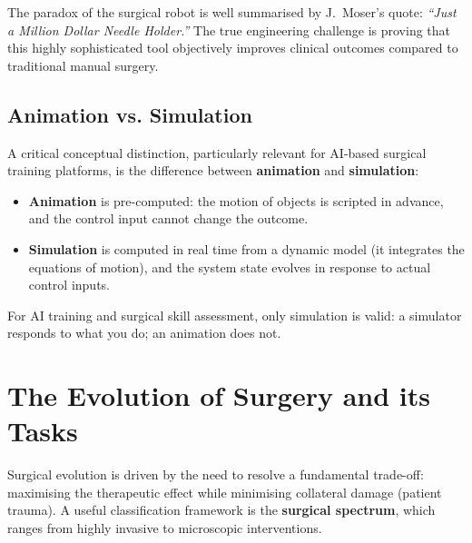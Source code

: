 \documentclass[11pt,a4paper,twoside]{report}
\begin{document}
The paradox of the surgical robot is well summarised by J.\ Moser's quote: \textit{``Just a Million Dollar Needle Holder.''} The true engineering challenge is proving that this highly sophisticated tool objectively improves clinical outcomes compared to traditional manual surgery.

\subsection{Animation vs. Simulation}
A critical conceptual distinction, particularly relevant for AI-based surgical training platforms, is the difference between \textbf{animation} and \textbf{simulation}:
\begin{itemize}
    \item \textbf{Animation} is pre-computed: the motion of objects is scripted in advance, and the control input cannot change the outcome.
    \item \textbf{Simulation} is computed in real time from a dynamic model (it integrates the equations of motion), and the system state evolves in response to actual control inputs.
\end{itemize}
For AI training and surgical skill assessment, only simulation is valid: a simulator responds to what you do; an animation does not.

\section{The Evolution of Surgery and its Tasks}
Surgical evolution is driven by the need to resolve a fundamental trade-off: maximising the therapeutic effect while minimising collateral damage (patient trauma). A useful classification framework is the \textbf{surgical spectrum}, which ranges from highly invasive to microscopic interventions.
\end{document}
